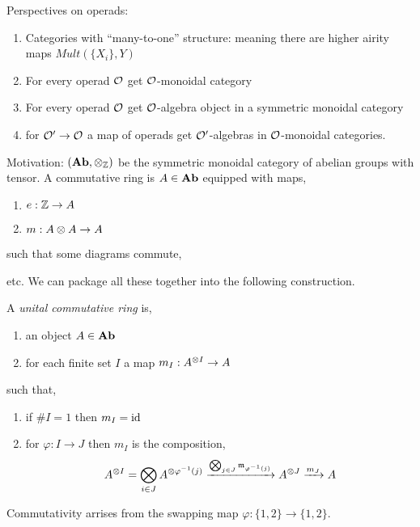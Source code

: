 \documentclass[12pt]{article}
\begin{document}
Perspectives on operads:
\begin{enumerate}
\item Categories with ``many-to-one'' structure: meaning there are higher airity maps $Mult( \{ X_i \}, Y)$

\item For every operad $\mathcal{O}$ get $\mathcal{O}$-monoidal category 

\item For every operad $\mathcal{O}$ get $\mathcal{O}$-algebra object in a symmetric monoidal category

\item for $\mathcal{O}' \to \mathcal{O}$ a map of operads get $\mathcal{O}'$-algebras in $\mathcal{O}$-monoidal categories.
\end{enumerate}

Motivation: $(\mathbf{Ab}, \otimes_{\mathbb{Z}})$ be the symmetric monoidal category of abelian groups with tensor. A commutative ring is $A \in \mathbf{Ab}$ equipped with maps,
\begin{enumerate}
\item $e : \mathbb{Z} \to A$
\item $m : A \otimes A \to A$
\end{enumerate}
such that some diagrams commute,
\begin{center}
\end{center}
etc. We can package all these together into the following construction.

\begin{defn}
A \textit{unital commutative ring} is,
\begin{enumerate}
\item an object $A \in \mathbf{Ab}$
\item for each finite set $I$ a map $m_I : A^{\otimes I} \to A$
\end{enumerate}
such that,
\begin{enumerate}
\item if $\# I = 1$ then $m_I = \mathrm{id}$
\item for $\varphi : I \to J$ then $m_I$ is the composition,
\[ A^{\otimes I} = \bigotimes_{i \in J} A^{\otimes \varphi^{-1}(j)} \xrightarrow{\bigotimes_{j \in J} \mathfrak{m}_{\varphi^{-1}(j)}} A^{\otimes J} \xrightarrow{m_J} A \]
\end{enumerate}
\end{defn}

\begin{rmk}
Commutativity arrises from the swapping map $\varphi : \{ 1, 2\} \to \{ 1, 2 \}$.
\end{rmk}
\end{document}
